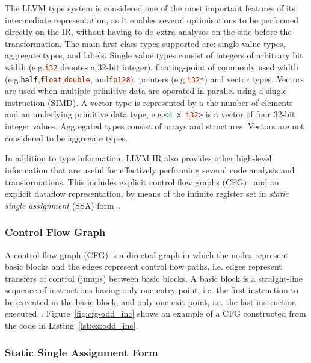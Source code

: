 The LLVM type system is considered one of the most important features of its intermediate representation, as it enables several optimisations to be performed directly on the IR, without having to do extra analyses on the side before the transformation.
The main first class types supported are: single value types, aggregate types, and labels.
Single value types consist of integers of arbitrary bit width (e.g.\lstinline[language=llvm,style=nasm]{i32} denotes a 32-bit integer), floating-point of commonly used width (e.g.\lstinline[language=llvm,style=nasm]{half},\lstinline[language=llvm,style=nasm]{float},\lstinline[language=llvm,style=nasm]{double}, and\lstinline[language=llvm,style=nasm]{fp128}), pointers (e.g.\lstinline[language=llvm,style=nasm]{i32*}) and vector types.
Vectors are used when multiple primitive data are operated in parallel using a single instruction (SIMD).
A vector type is represented by a the number of elements and an underlying primitive data type, e.g.\lstinline[language=llvm,style=nasm]{<4 x i32>} is a vector of four 32-bit integer values.
Aggregated types consist of arrays and structures.
Vectors are not considered to be aggregate types.

In addition to type information, LLVM IR also provides other high-level information that are useful for effectively performing several code analysis and transformations.
This includes explicit control flow graphs (CFG)~\citep{allen70} and an explicit dataflow representation, by means of the infinite register set in \textit{static single assignment} (SSA) form~\citep{alpern88,cytron89,cytron91}.

\subsubsection{Control Flow Graph}

A control flow graph (CFG) is a directed graph in which the nodes represent basic blocks and the edges represent control flow paths, i.e. edges represent transfers of control (jumps) between basic blocks.
A basic block is a straight-line sequence of instructions having only one entry point, i.e. the first instruction to be executed in the basic block, and only one exit point, i.e. the last instruction executed~\citep{allen70,cytron91}.
Figure~\ref{fig:cfg-odd_inc} shows an example of a CFG constructed from the code in Listing~\ref{lst:ex:odd_inc}.

\subsubsection{Static Single Assignment Form}

